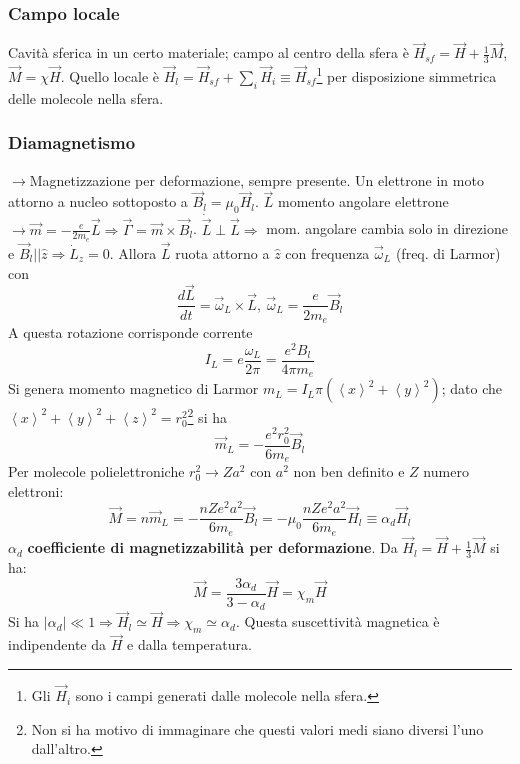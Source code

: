 \documentclass[a4paper]{scrartcl}
\numberwithin{equation}{subsection}
\theoremstyle{style1}
\begin{document}
\subsubsection{Campo locale}
Cavit\`a sferica in un certo materiale; campo al centro della sfera \`e $\vec{H}_{sf} = \vec{H}+\frac{1}{3}\vec{M}$, $\vec{M}=\chi \vec{H}$. Quello locale \`e $\vec{H}_l = \vec{H}_{sf}  + \sum_{i}^{} \vec{H}_i\equiv \vec{H}_{sf} $\footnote{Gli $\vec{H}_i$ sono i campi generati dalle molecole nella sfera.} per disposizione simmetrica delle molecole nella sfera.
\subsubsection{Diamagnetismo}

$\to$Magnetizzazione per deformazione, sempre presente. Un elettrone in moto attorno a nucleo sottoposto a $\vec{B}_l = \mu_0 \vec{H}_l$. $\vec{L}$ momento angolare elettrone $\to \vec{m} = - \frac{e}{2m_e}\vec{L}\Rightarrow \vec{\Gamma} = \vec{m} \times \vec{B}_l$. $\dot{\vec{L}} \perp \vec{L}\Rightarrow $ mom. angolare cambia solo in direzione e $\vec{B}_l | | \hat{z}\Rightarrow \dot{L}_z = 0$. Allora $\vec{L}$ ruota attorno a $\hat{z}$ con frequenza $\vec{\omega}_L$ (freq. di Larmor) con
\begin{equation*}
	\frac{d \vec{L}}{d t}  = \vec{\omega}_L \times \vec{L}, \ \vec{\omega}_L =  \frac{e}{2m_e}\vec{B}_l
\end{equation*}
A questa rotazione corrisponde corrente
\[
I_L = e \frac{\omega_L}{2\pi} = \frac{e^2 B_l}{4 \pi m_e}
\] 
Si genera momento magnetico di Larmor $m_L = I_L \pi(\left\langle x \right\rangle^2 + \left\langle y \right\rangle^2)$; dato che $\left\langle x \right\rangle^2 + \left\langle y \right\rangle^2 + \left\langle z \right\rangle^2 = r_0^2$\footnote{Non si ha motivo di immaginare che questi valori medi siano diversi l'uno dall'altro.} si ha
\[
\vec{m}_L = - \frac{e^2 r_0^2}{6m_e}\vec{B}_l
\] 
Per molecole polielettroniche $r_0^2 \to Z a^2$ con $a^2$ non ben definito e $Z$ numero elettroni:
\begin{equation}
	\vec{M} = n \vec{m}_L = - \frac{nZe^2 a^2}{6m_e} \vec{B}_l = - \mu_0 \frac{nZe^2 a^2}{6m_e}\vec{H}_l \equiv \alpha _d \vec{H}_l
\end{equation}
$\alpha _d$ \textbf{coefficiente di magnetizzabilit\`a per deformazione}. Da $\vec{H}_l = \vec{H}+ \frac{1}{3}\vec{M}$ si ha:
\begin{equation}
	\vec{M}= \frac{3\alpha _d}{3 - \alpha _d} \vec{H}=\chi _m \vec{H}
\end{equation}
Si ha $|\alpha _d| \ll 1\Rightarrow \vec{H}_l \simeq \vec{H}\Rightarrow \chi _m \simeq \alpha _d$. Questa suscettivit\`a magnetica \`e indipendente da $\vec{H}$ e dalla temperatura.
\end{document}
